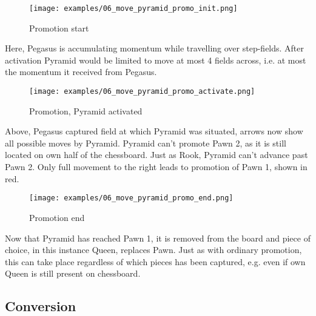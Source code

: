 \clearpage %

\noindent
\begin{figure}[!h]
\texttt{[image: examples/06\_move\_pyramid\_promo\_init.png]}
\caption{Promotion start}
\label{fig:06_move_pyramid_promo_init}
\end{figure}

Here, Pegasus is accumulating momentum while travelling over step-fields. After
activation Pyramid would be limited to move at most 4 fields across, i.e. at most
the momentum it received from Pegasus.

\clearpage %

\noindent
\begin{figure}[!h]
\texttt{[image: examples/06\_move\_pyramid\_promo\_activate.png]}
\caption{Promotion, Pyramid activated}
\label{fig:06_move_pyramid_promo_activate}
\end{figure}

Above, Pegasus captured field at which Pyramid was situated, arrows now show
all possible moves by Pyramid. Pyramid can't promote Pawn 2, as it is still
located on own half of the chessboard. Just as Rook, Pyramid can't advance
past Pawn 2. Only full movement to the right leads to promotion of Pawn 1,
shown in red.

\clearpage %

\noindent
\begin{figure}[!h]
\texttt{[image: examples/06\_move\_pyramid\_promo\_end.png]}
\caption{Promotion end}
\label{fig:06_move_pyramid_promo_end}
\end{figure}

Now that Pyramid has reached Pawn 1, it is removed from the board and piece of
choice, in this instance Queen, replaces Pawn. Just as with ordinary promotion,
this can take place regardless of which pieces has been captured, e.g. even if
own Queen is still present on chessboard.

\clearpage %

\subsection*{Conversion}

